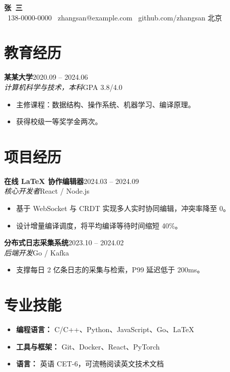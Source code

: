 \documentclass[10pt]{article}
\newcommand{\entry}[4]{%
  \textbf{#1}\hfill #2\\
  \textit{#3}\hfill #4\par\vspace{0.2em}%
}
\begin{document}
\begin{center}
  {\Huge\bfseries 张\ 三}\\[0.3em]
  {\color{accent}\small \faPhone\ 138-0000-0000 \quad \faEnvelope\ zhangsan@example.com \quad \faGithub\ github.com/zhangsan \quad 北京}
\end{center}

\section{教育经历}
\entry{某某大学}{2020.09 -- 2024.06}{计算机科学与技术，本科}{GPA 3.8/4.0}
\begin{itemize}
  \item 主修课程：数据结构、操作系统、机器学习、编译原理。
  \item 获得校级一等奖学金两次。
\end{itemize}

\section{项目经历}
\entry{在线 LaTeX 协作编辑器}{2024.03 -- 2024.09}{核心开发者}{React / Node.js}
\begin{itemize}
  \item 基于 WebSocket 与 CRDT 实现多人实时协同编辑，冲突率降至 0。
  \item 设计增量编译调度，将平均编译等待时间缩短 40\%。
\end{itemize}

\entry{分布式日志采集系统}{2023.10 -- 2024.02}{后端开发}{Go / Kafka}
\begin{itemize}
  \item 支撑每日 2 亿条日志的采集与检索，P99 延迟低于 200ms。
\end{itemize}

\section{专业技能}
\begin{itemize}
  \item \textbf{编程语言：} C/C++、Python、JavaScript、Go、\LaTeX
  \item \textbf{工具与框架：} Git、Docker、React、PyTorch
  \item \textbf{语言：} 英语 CET-6，可流畅阅读英文技术文档
\end{itemize}
\end{document}
